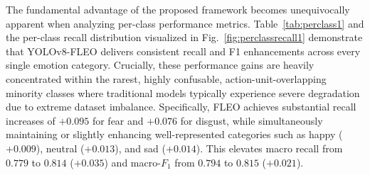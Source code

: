 \documentclass[algorithms,article,submit,moreauthors]{Definitions/mdpi}
\begin{document}
The fundamental advantage of the proposed framework becomes unequivocally apparent when analyzing per-class performance metrics. Table~\ref{tab:perclass1} and the per-class recall distribution visualized in Fig.~\ref{fig:perclassrecall1} demonstrate that YOLOv8-FLEO delivers consistent recall and F1 enhancements across every single emotion category. Crucially, these performance gains are heavily concentrated within the rarest, highly confusable, action-unit-overlapping minority classes where traditional models typically experience severe degradation due to extreme dataset imbalance. Specifically, FLEO achieves substantial recall increases of $+0.095$ for fear and $+0.076$ for disgust, while simultaneously maintaining or slightly enhancing well-represented categories such as happy ($+0.009$), neutral ($+0.013$), and sad ($+0.014$). This elevates macro recall from $0.779$ to $0.814$ ($+0.035$) and macro-$F_1$ from $0.794$ to $0.815$ ($+0.021$).

\begin{table}[h!]
\centering
\caption{Per-class recall and $F_1$ score on RAF-DB comparing baseline YOLOv8s and YOLOv8-FLEO.}
\label{tab:perclass1}
\end{table}
\end{document}
